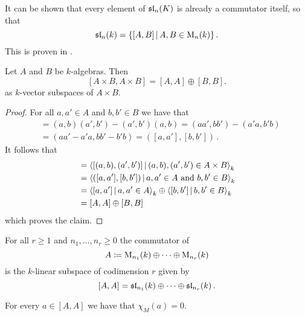 \begin{remark}
  It can be shown that every element of $\operatorname{\mathfrak{sl}}_n(K)$ is already a commutator itself, so that
  \[
      \sllie_n(k)
    = \{ [A,B] \suchthat A, B \in \Mat_n(k) \} \,.
  \]
  This is proven in \cite{TraceZero}.
\end{remark}


\begin{lemma}
  Let $A$ and $B$ be $k$-algebras.
  Then
  \[
      [A \times B, A \times B]
    = [A,A] \oplus [B,B].
  \]
  as $k$-vector subspaces of $A \times B$.
\end{lemma}
\begin{proof}
  For all $a, a' \in A$ and $b, b' \in B$ we have that
  \begin{align*}
        [(a,b),(a',b')]
    &=  (a,b)(a',b') - (a',b')(a,b)
     =  (aa',bb') - (a'a, b'b) \\
    &=  (aa'-a'a, bb' - b'b)
     =  ([a,a'], [b,b']) \,.
  \end{align*}
  It follows that
  \begin{align*}
        [A \times B, A \times B]
    &=  \gen{
          [(a,b), (a',b')]
        \suchthat
          (a,b), (a',b') \in A \times B
        }_k \\
    &= \gen{
          ([a,a'], [b,b'])
        \suchthat
          a, a' \in A
          \text{ and }
          b, b' \in B
        }_k \\
    &=  \gen{ [a,a'] \suchthat a, a' \in A }_k
        \oplus
        \gen{ [b,b'] \suchthat b, b' \in B }_k \\
    &= [A,A] \oplus [B,B]
  \end{align*}
  which proves the claim.
\end{proof}


\begin{corollary}
  \label{corollary: commutator product of matrix algebras}
  For all $r \geq 1$ and $n_1, \dots, n_r \geq 0$ the commutator of
  \[
              A
     \coloneqq \operatorname{M}_{n_1}(k) \oplus \dotsb \oplus \operatorname{M}_{n_r}(k)
  \]
  is the $k$-linear subspace of codimension $r$ given by
  \[
        [A,A]
     =  \operatorname{\mathfrak{sl}}_{n_1}(k) \oplus \dotsb \oplus \operatorname{\mathfrak{sl}}_{n_r}(k) \,.
  \]
\end{corollary}


\begin{lemma}
  \label{lemma: characters are zero on commutators}
  For every $a \in [A,A]$ we have that $\chi_M(a) = 0$.
\end{lemma}


